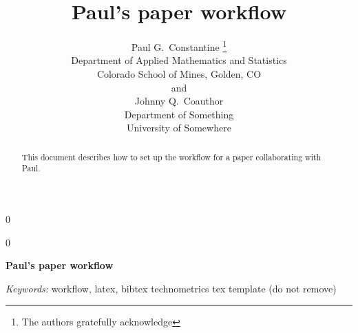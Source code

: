 \documentclass[12pt]{article}
\newcommand{\blind}{0}
\begin{document}
%

\def\spacingset#1{\renewcommand{\baselinestretch}%
{#1}\small\normalsize} \spacingset{1}



\blind
{
\title{\bf Paul's paper workflow}
\author{Paul G.~Constantine%
\thanks{%
The authors gratefully acknowledge
}
\hspace{.2cm}\\
Department of Applied Mathematics and Statistics \\
Colorado School of Mines, Golden, CO \\
and \\
Johnny Q.~Coauthor \\
Department of Something \\
University of Somewhere}
\maketitle
} \fi

\blind
{
\bigskip
\bigskip
\bigskip
\begin{center}
{\LARGE\bf Paul's paper workflow}
\end{center}
\medskip
} \fi

\bigskip
\begin{abstract}
This document describes how to set up the workflow for a paper collaborating with Paul.
\end{abstract}

\noindent%
{\it Keywords:} workflow, latex, bibtex
\vfill
\hfill {\tiny technometrics tex template (do not remove)}

\newpage
\spacingset{1.45} %










\end{document}
